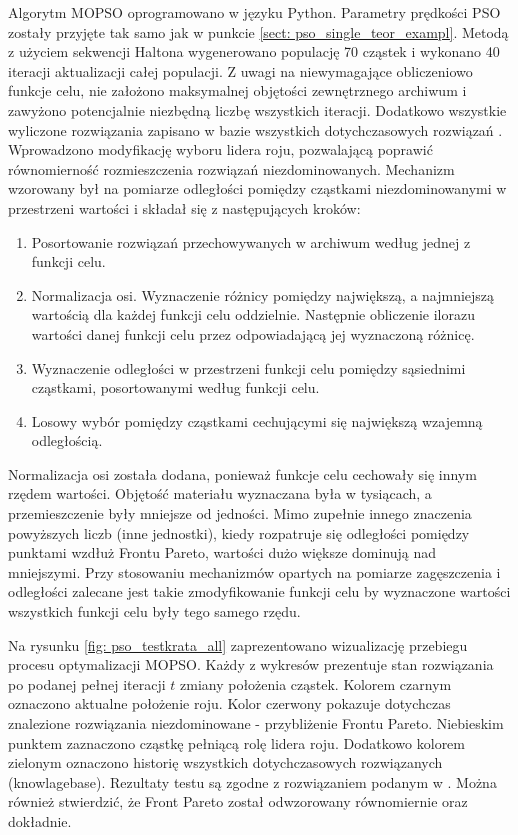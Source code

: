 Algorytm MOPSO oprogramowano w języku Python. Parametry prędkości PSO zostały przyjęte tak samo jak w punkcie \ref{sect: pso_single_teor_exampl}. Metodą z użyciem sekwencji Haltona wygenerowano populację 70 cząstek i wykonano 40 iteracji aktualizacji całej populacji. Z uwagi na niewymagające obliczeniowo funkcje celu, nie założono maksymalnej objętości zewnętrznego archiwum i zawyżono potencjalnie niezbędną liczbę wszystkich iteracji. Dodatkowo wszystkie wyliczone rozwiązania zapisano w bazie wszystkich dotychczasowych rozwiązań . Wprowadzono modyfikację wyboru lidera roju, pozwalającą poprawić równomierność rozmieszczenia rozwiązań niezdominowanych. Mechanizm wzorowany był na pomiarze odległości pomiędzy cząstkami niezdominowanymi w przestrzeni wartości \parencite{Deb2002} i składał się z następujących kroków:
\begin{enumerate}
	\item Posortowanie rozwiązań przechowywanych w archiwum według jednej z funkcji celu.
	\item Normalizacja osi. Wyznaczenie różnicy pomiędzy największą, a najmniejszą wartością dla każdej funkcji celu oddzielnie. Następnie obliczenie ilorazu wartości danej funkcji celu przez odpowiadającą jej wyznaczoną różnicę.
	\item Wyznaczenie odległości w przestrzeni funkcji celu pomiędzy sąsiednimi cząstkami, posortowanymi według funkcji celu.
	\item Losowy wybór pomiędzy cząstkami cechującymi się największą wzajemną odległością.
\end{enumerate}
Normalizacja osi została dodana, ponieważ funkcje celu cechowały się innym rzędem wartości. Objętość materiału wyznaczana była w tysiącach, a przemieszczenie były mniejsze od jedności. Mimo zupełnie innego znaczenia powyższych liczb (inne jednostki), kiedy rozpatruje się odległości pomiędzy punktami wzdłuż Frontu Pareto, wartości dużo większe dominują nad mniejszymi. Przy stosowaniu mechanizmów opartych na pomiarze zagęszczenia i odległości zalecane jest takie zmodyfikowanie funkcji celu by wyznaczone wartości wszystkich funkcji celu były tego samego rzędu.

Na rysunku \ref{fig: pso_testkrata_all} zaprezentowano wizualizację przebiegu procesu optymalizacji MOPSO. Każdy z wykresów prezentuje stan rozwiązania po podanej pełnej iteracji $t$ zmiany położenia cząstek. Kolorem czarnym oznaczono aktualne położenie roju. Kolor czerwony pokazuje dotychczas znalezione rozwiązania niezdominowane - przybliżenie Frontu Pareto. Niebieskim punktem zaznaczono cząstkę pełniącą rolę lidera roju. Dodatkowo kolorem zielonym oznaczono historię wszystkich dotychczasowych rozwiązanych (knowlagebase). Rezultaty testu są zgodne z rozwiązaniem podanym w \parencite{Zavala2014}. Można również stwierdzić, że Front Pareto został odwzorowany równomiernie oraz dokładnie.

